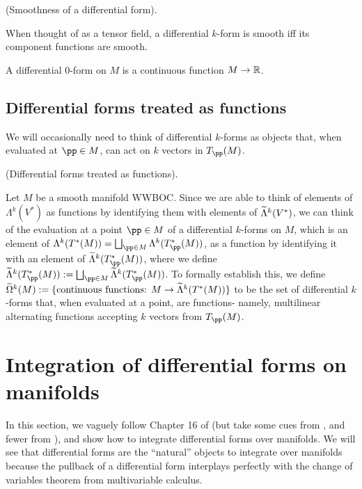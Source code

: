 \begin{theorem}
      (Smoothness of a differential form).
    
    When thought of as a tensor field, a differential $k$-form is smooth iff its component functions are smooth.
\end{theorem}

\begin{remark}
    A differential 0-form on $M$ is a continuous function $M \rightarrow \mathbb{R}$.
\end{remark}

\subsection*{Differential forms treated as functions}

We will occasionally need to think of differential $k$-forms as objects that, when evaluated at $\pp \in M$, can act on $k$ vectors in $T_\pp(M)$.

\begin{deriv}
\label{ch::diff_forms::deriv::diff_forms_actual_fns}
    (Differential forms treated as functions).
    
    Let $M$ be a smooth manifold WWBOC. Since we are able to think of elements of $\Lambda^k(V^*)$ as functions by identifying them with elements of $\widetilde{\Lambda}^k(V^*)$, we can think of the evaluation at a point $\pp \in M$ of a differential $k$-forms on $M$, which is an element of $\Lambda^k(T^*(M)) = \bigsqcup_{\pp \in M} \Lambda^k(T_\pp^*(M))$, as a function by identifying it with an element of $\tLambda^k(T_\pp^*(M))$, where we define ${\tLambda^k(T_\pp^*(M)) := \bigsqcup_{\pp \in M} \tLambda^k(T_\pp^*(M))}$. To formally establish this, we define ${\widetilde{\Omega}^k(M) := \{ \text{continuous functions: $M \rightarrow \widetilde{\Lambda}^k(T^*(M))$} \}}$ to be the set of differential $k$-forms that, when evaluated at a point, are functions- namely, multilinear alternating functions accepting $k$ vectors from $T_\pp(M)$.
\end{deriv}

\newpage

\section{Integration of differential forms on manifolds}

In this section, we vaguely follow Chapter 16 of \cite{book::SM} (but take some cues from \cite{book::Hubbard}, and fewer from \cite{book::DiffTop}), and show how to integrate differential forms over manifolds. We will see that differential forms are the ``natural'' objects to integrate over manifolds because the pullback of a differential form interplays perfectly with the change of variables theorem from multivariable calculus.

